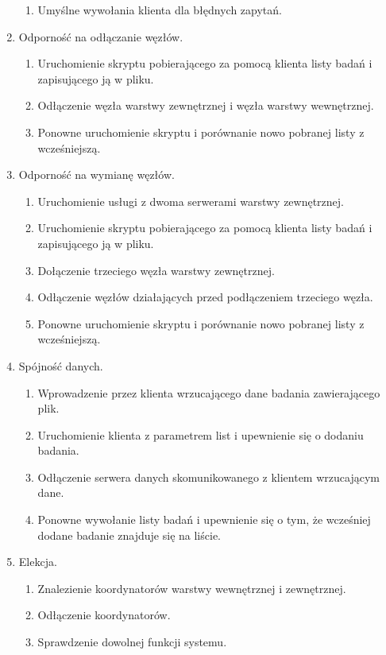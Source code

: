 \begin{enumerate}
\begin{enumerate}[label*=\arabic*.]
		\item Umyślne wywołania klienta dla błędnych zapytań. 
	\end{enumerate}
	\item Odporność na odłączanie węzłów.
	\begin{enumerate}[label*=\arabic*.]
		\item Uruchomienie skryptu pobierającego za pomocą klienta listy badań i zapisującego ją w pliku. 
		\item Odłączenie węzła warstwy zewnętrznej i węzła warstwy wewnętrznej.
		\item Ponowne uruchomienie skryptu i porównanie nowo pobranej listy z wcześniejszą.
	\end{enumerate}
	\item Odporność na wymianę węzłów.
	\begin{enumerate}[label*=\arabic*.]
		\item Uruchomienie usługi z dwoma serwerami warstwy zewnętrznej. 
		\item Uruchomienie skryptu pobierającego za pomocą klienta listy badań i zapisującego ją w pliku.
		\item Dołączenie trzeciego węzła warstwy zewnętrznej.
		\item Odłączenie węzłów działających przed podłączeniem trzeciego węzła.
		\item Ponowne uruchomienie skryptu i porównanie nowo pobranej listy z wcześniejszą.
	\end{enumerate}
	\item Spójność danych.
	\begin{enumerate}[label*=\arabic*.]
		\item Wprowadzenie przez klienta wrzucającego dane badania zawierającego plik. 
		\item Uruchomienie klienta z parametrem list i upewnienie się o dodaniu badania.
		\item Odłączenie serwera danych skomunikowanego z klientem wrzucającym dane.
		\item Ponowne wywołanie listy badań i upewnienie się o tym, że wcześniej dodane badanie znajduje się na liście.
	\end{enumerate}
	\item Elekcja.
	\begin{enumerate}[label*=\arabic*.]
		\item Znalezienie koordynatorów warstwy wewnętrznej i zewnętrznej.
		\item Odłączenie koordynatorów. 
		\item Sprawdzenie dowolnej funkcji systemu.  

\end{enumerate}
\end{enumerate}
